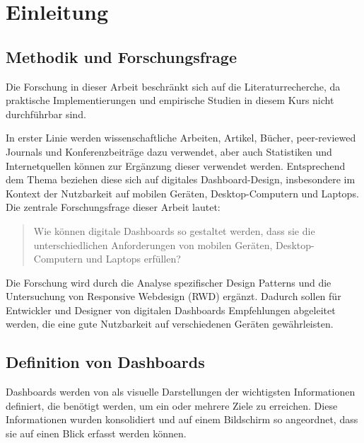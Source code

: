 \section{Einleitung}\label{sec:einleitung}


\subsection{Methodik und Forschungsfrage}\label{subsec:methodik-forschungsfrage}

Die Forschung in dieser Arbeit beschränkt sich auf die Literaturrecherche, da praktische Implementierungen und empirische Studien in diesem Kurs nicht durchführbar sind.

In erster Linie werden wissenschaftliche Arbeiten, Artikel, Bücher, peer-reviewed Journals und Konferenzbeiträge dazu verwendet, aber auch Statistiken und Internetquellen können zur Ergänzung dieser verwendet werden.
Entsprechend dem Thema beziehen diese sich auf digitales Dashboard-Design, insbesondere im Kontext der Nutzbarkeit auf mobilen Geräten, Desktop-Computern und Laptops.
Die zentrale Forschungsfrage dieser Arbeit lautet:

\begin{quote}
    Wie können digitale Dashboards so gestaltet werden, dass sie die unterschiedlichen Anforderungen von mobilen Geräten, Desktop-Computern und Laptops erfüllen?
\end{quote}

Die Forschung wird durch die Analyse spezifischer Design Patterns und die Untersuchung von Responsive Webdesign (RWD) ergänzt.
Dadurch sollen für Entwickler und Designer von digitalen Dashboards Empfehlungen abgeleitet werden, die eine gute Nutzbarkeit auf verschiedenen Geräten gewährleisten.

\subsection{Definition von Dashboards}\label{subsec:dashboard-definition-limits}

Dashboards werden von \autocite{Few.InformationDashboardDesign.2013} als visuelle Darstellungen der wichtigsten Informationen definiert, die benötigt werden, um ein oder mehrere Ziele zu erreichen.
Diese Informationen wurden konsolidiert und auf einem Bildschirm so angeordnet, dass sie auf einen Blick erfasst werden können.

